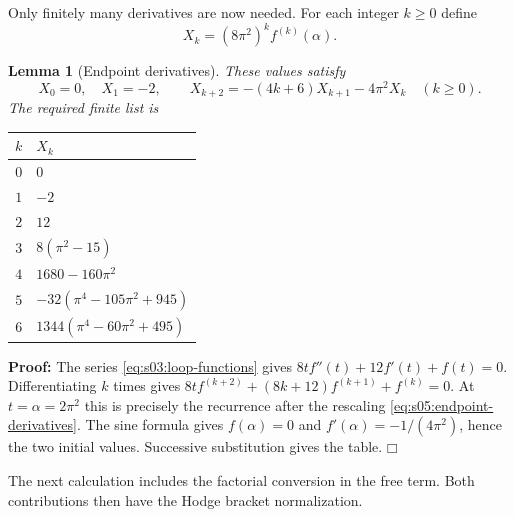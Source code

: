 \documentclass[a4paper,10pt]{article}
\numberwithin{equation}{section}
\theoremstyle{paperplain}
\newtheorem{lmm}[thm]{Lemma}
\theoremstyle{paperremark}
\theoremstyle{paperplain}
\newenvironment{prf}{\noindent \textbf{Proof: }}{\hfill $\mdlgwhtsquare$\par\addvspace{0.5\baselineskip}}
\begin{document}
Only finitely many derivatives are now needed. For each integer
$k\geq0$ define
\begin{equation}\label{eq:s05:endpoint-derivatives}
 X_k=(8\pi^2)^k f^{(k)}(\alpha).
\end{equation}

\begin{lmm}[Endpoint derivatives]\label{lmm:s05:endpoint-derivatives}
These values satisfy
\begin{equation}\label{eq:s05:derivative-recurrence}
 X_0=0,\quad X_1=-2,\qquad
 X_{k+2}=-(4k+6)X_{k+1}-4\pi^2X_k\quad(k\geq0).
\end{equation}
The required finite list is
\begin{center}
\begin{tabular}{c|l}
$k$ & $X_k$ \\\hline
$0$ & $0$ \\
$1$ & $-2$ \\
$2$ & $12$ \\
$3$ & $8(\pi^2-15)$ \\
$4$ & $1680-160\pi^2$ \\
$5$ & $-32(\pi^4-105\pi^2+945)$ \\
$6$ & $1344(\pi^4-60\pi^2+495)$
\end{tabular}
\end{center}
\end{lmm}
\begin{prf}
The series \eqref{eq:s03:loop-functions} gives
$8tf''(t)+12f'(t)+f(t)=0$. Differentiating $k$ times gives
$8tf^{(k+2)}+(8k+12)f^{(k+1)}+f^{(k)}=0$.
At $t=\alpha=2\pi^2$ this is precisely the recurrence after the
rescaling \eqref{eq:s05:endpoint-derivatives}.
The sine formula gives $f(\alpha)=0$ and
$f'(\alpha)=-1/(4\pi^2)$, hence the two initial values.
Successive substitution gives the table.
\end{prf}

The next calculation includes the factorial conversion in the free
term. Both contributions then have the Hodge bracket normalization.
\end{document}
